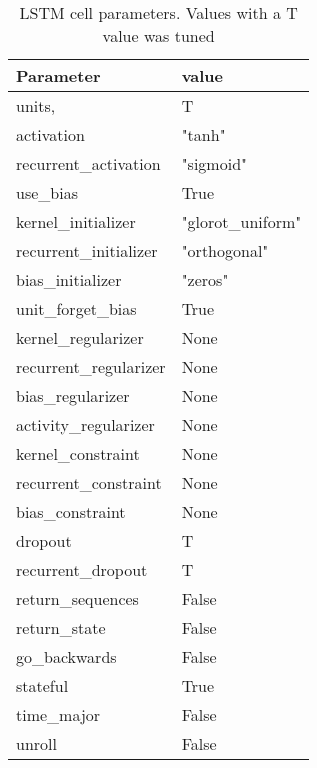 \begin{table}[H]
  \centering
  \caption{LSTM cell parameters. Values with a T value was tuned}
  \label{table:LSTM-cell-parameters}
  \begin{tabular}{|l|l|}\hline
    Parameter              & value             \\ \hline
    \hline
    units,                 & T                 \\
    activation             & "tanh"            \\
    recurrent\_activation  & "sigmoid"         \\
    use\_bias              & True              \\
    kernel\_initializer    & "glorot\_uniform" \\
    recurrent\_initializer & "orthogonal"      \\
    bias\_initializer      & "zeros"           \\
    unit\_forget\_bias     & True              \\
    kernel\_regularizer    & None              \\
    recurrent\_regularizer & None              \\
    bias\_regularizer      & None              \\
    activity\_regularizer  & None              \\
    kernel\_constraint     & None              \\
    recurrent\_constraint  & None              \\
    bias\_constraint       & None              \\
    dropout                & T                 \\
    recurrent\_dropout     & T                 \\
    return\_sequences      & False             \\
    return\_state          & False             \\
    go\_backwards          & False             \\
    stateful               & True              \\
    time\_major            & False             \\
    unroll                 & False             \\
    \hline
  \end{tabular}
\end{table}

